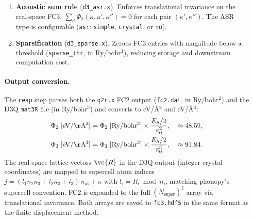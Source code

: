 \begin{enumerate}
  \item \textbf{Acoustic sum rule} (\texttt{d3\_asr.x}).
        Enforces translational invariance on the real-space FC3,
        $\sum_\kappa \Phi_3(\kappa,\kappa',\kappa'') = 0$ for each
        pair $(\kappa',\kappa'')$.  The ASR type is configurable
        (\texttt{asr}: \texttt{simple}, \texttt{crystal}, or
        \texttt{no}).

  \item \textbf{Sparsification} (\texttt{d3\_sparse.x}).
        Zeroes FC3 entries with magnitude below a threshold
        (\texttt{sparse\_thr}, in Ry/bohr$^3$), reducing storage
        and downstream computation cost.
\end{enumerate}

\paragraph{Output conversion.}
The \texttt{reap} step parses both the \texttt{q2r.x} FC2 output
(\texttt{fc2.dat}, in Ry/bohr$^2$) and the D3Q \texttt{mat3R} file (in
Ry/bohr$^3$) and converts to eV/\AA$^2$ and eV/\AA$^3$:
\begin{align}
  \Phi_2\;[\mathrm{eV/\AA^2}]
    &= \Phi_2\;[\mathrm{Ry/bohr^2}]
       \times \frac{E_h/2}{a_0^2},
    &&\approx 48.59, \label{eq:fc2_conv} \\
  \Phi_3\;[\mathrm{eV/\AA^3}]
    &= \Phi_3\;[\mathrm{Ry/bohr^3}]
       \times \frac{E_h/2}{a_0^3},
    &&\approx 91.84. \label{eq:fc3_conv}
\end{align}
The real-space lattice vectors $\vc{R}$ in the D3Q output (integer
crystal coordinates) are mapped to supercell atom indices
$j = (l_1 n_2 n_3 + l_2 n_3 + l_3)\, n_\text{at} + \kappa$ with
$l_i = R_i \bmod n_i$, matching phonopy's supercell convention.  FC2
is expanded to the full $(N_\text{super})^2$ array via translational
invariance.  Both arrays are saved to \texttt{fc3.hdf5} in the same
format as the finite-displacement method.

